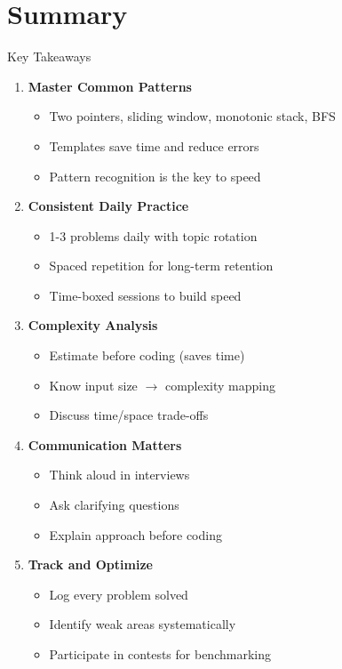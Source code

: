 \documentclass[aspectratio=169,xcolor=dvipsnames]{beamer}
\begin{document}
\section{Summary}

\begin{frame}{Key Takeaways}
  \begin{enumerate}
    \item \textbf{Master Common Patterns}
    \begin{itemize}
      \item Two pointers, sliding window, monotonic stack, BFS
      \item Templates save time and reduce errors
      \item Pattern recognition is the key to speed
    \end{itemize}

    \vspace{0.2cm}
    \item \textbf{Consistent Daily Practice}
    \begin{itemize}
      \item 1-3 problems daily with topic rotation
      \item Spaced repetition for long-term retention
      \item Time-boxed sessions to build speed
    \end{itemize}

    \vspace{0.2cm}
    \item \textbf{Complexity Analysis}
    \begin{itemize}
      \item Estimate before coding (saves time)
      \item Know input size $\to$ complexity mapping
      \item Discuss time/space trade-offs
    \end{itemize}

    \vspace{0.2cm}
    \item \textbf{Communication Matters}
    \begin{itemize}
      \item Think aloud in interviews
      \item Ask clarifying questions
      \item Explain approach before coding
    \end{itemize}

    \vspace{0.2cm}
    \item \textbf{Track and Optimize}
    \begin{itemize}
      \item Log every problem solved
      \item Identify weak areas systematically
      \item Participate in contests for benchmarking
    \end{itemize}
  \end{enumerate}
\end{frame}
\end{document}
